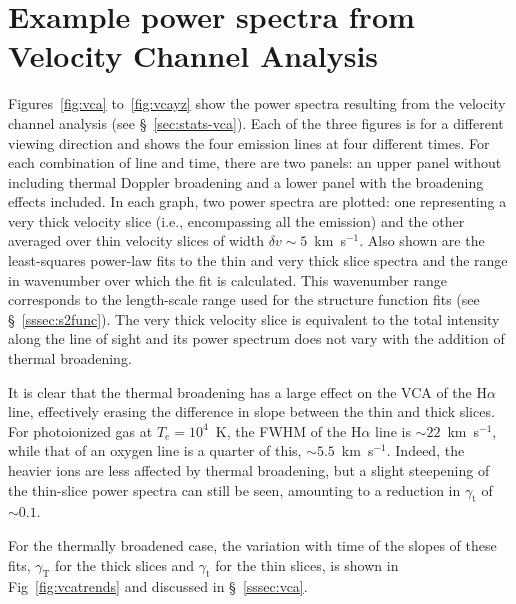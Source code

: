 \documentclass[useAMS,usenatbib]{mn2e}
\newcommand\gammaVCAthin{\ensuremath{\gamma_{\mathrm{t}}}} %
\newcommand\gammaVCAvthick{\ensuremath{\gamma_{\mathrm{T}}}} %
\providecommand{\DIFadd}[1]{{\protect\color{red!70!black}#1}} %
\begin{document}
\section[]{\DIFadd{Example power spectra from Velocity Channel Analysis}}
\label{app:vca}
\DIFadd{Figures~\ref{fig:vca} to~\ref{fig:vcayz} show the power spectra
resulting from the velocity channel analysis (see
\S~\ref{sec:stats-vca}). Each of the three figures is for a different
viewing direction and shows the four emission lines at four different
times. For each combination of line and time, there are two panels: an
upper panel without including thermal Doppler broadening and a lower
panel with the broadening effects included.  In each graph, two power
spectra are plotted: one representing a very thick velocity slice
(i.e., encompassing all the emission) and the other averaged over thin
velocity slices of width $\delta v \sim 5$~km~s$^{-1}$.  Also shown
are the least-squares power-law fits to the thin and very thick slice
spectra and the range in wavenumber over which the fit is
calculated. This wavenumber range corresponds to the length-scale
range used for the structure function fits (see
\S~\ref{sssec:s2func}).  The very thick velocity slice is equivalent
to the total intensity along the line of sight and its power spectrum
does not vary with the addition of thermal broadening.
}

\DIFadd{It is clear that the thermal broadening has a large effect on the VCA
of the H$\alpha$ line, effectively erasing the difference in slope
between the thin and thick slices.  For photoionized gas at $T_e=
10^4$~K, the FWHM of the H$\alpha$ line is $\sim 22$~km~s$^{-1}$,
while that of an oxygen line is a quarter of this, $\sim
5.5$~km~s$^{-1}$.  Indeed, the heavier ions are less affected by
thermal broadening, but a slight steepening of the thin-slice power
spectra can still be seen, amounting to a reduction in }\gammaVCAthin{}
\DIFadd{of \(\sim 0.1\).
}

\DIFadd{For the thermally broadened case, the variation with time of the
slopes of these fits, }\gammaVCAvthick{} \DIFadd{for the thick slices and
}\gammaVCAthin{} \DIFadd{for the thin slices, is shown in
Fig~\ref{fig:vcatrends} and discussed in \S~\ref{sssec:vca}.
}
\end{document}
